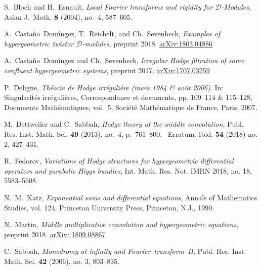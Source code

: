 \documentclass[11pt]{article}
\let\mathcal\mathscr
\begin{document}

\def\cprime{$'$}
\begin{thebibliography}{CDRS18}

S.~Bloch and H.~Esnault, \emph{Local Fourier
  transforms and rigidity for $\mathcal D$-Modules}, Asian J.~Math.
  {\bf 8} (2004), no.~4, 587--605.
 

A.~Casta{\~n}o~Dom{\'\i}ngez, T.~Reichelt, and
Ch.~Sevenheck, \emph{Examples of hypergeometric twistor $\mathcal
  D$\nobreakdash-modules}, preprint 2018. 
\href{https://arxiv.org/abs/1803.04886}{arXiv:1803.04886}

A.~Casta{\~n}o~Dom{\'\i}ngez and
Ch.~Sevenheck, \emph{Irregular Hodge filtration of some confluent
  hypergeome\-tric systems}, preprint 2017.
\href{https://arxiv.org/abs/1707.03259}{arXiv:1707.03259}

P.~Deligne, \emph{Th\'eorie de Hodge irr\'eguli\`ere (mars 1984 \&
  ao\^ut 2006)}. In: Singularit\'es irr\'eguli\`eres, Correspondance et
  documents, 
pp. 109--114 \& 115--128,  
  Documents Math\'ematiques, vol.~5, Soci{\'e}t{\'e}
  Math{\'e}matique de France, Paris, 2007.
   

M.~Dettweiler and C.~Sabbah, \emph{Hodge
  theory of the middle convolution}, Publ. Res. Inst. Math. Sci.
  {\bf 49} (2013), no.~4, p.~761--800. 
  \ Erratum: Ibid. {\bf 54}
  (2018) no.\,2, 427--431. 
 

R.~Fedorov, \emph{Variations of Hodge structures for
  hypergeometric differential operators and parabolic Higgs bundles}, 
Int. Math. Res. Not. IMRN 2018, no. 18, 5583--5608.
 

N.~M.~Katz, \emph{Exponential sums and differential equations}, Annals of Mathematics Studies, vol. 124, Princeton University Press, Princeton, N.J.,
  1990.  
 

N.~Martin, \emph{Middle multiplicative convolution and
  hypergeometric equations}, preprint 2018.
\href{https://arxiv.org/abs/1809.08867}{arXiv: 1809.08867}  

C.~Sabbah, \emph{Monodromy at infinity and
  Fourier~transform~II}, Publ. Res. Inst. Math. Sci. {\bf 42} (2006), no. 3,
803--835.
 


\end{thebibliography}
\end{document}
